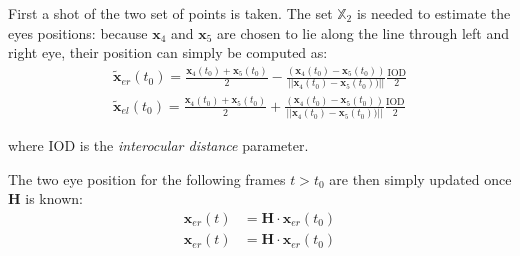 \documentclass[acmtocl,acmnow]{acmtrans2m}
\begin{document}
First a shot of the two set of points is taken. The set $\mathbb{X}_2$ is needed
to estimate the eyes positions: because $\mathbf{x}_4$ and $\mathbf{x}_5$ are
chosen to lie
along the line through left and right eye, their position can simply be computed
as:
\begin{eqnarray*}
\tilde{\mathbf{x}}_{er}(t_0) =  \frac{\mathbf{x}_4(t_0) + \mathbf{x}_5(t_0)}{2}
-  \frac{ (\mathbf{x}_4(t_0) - \mathbf{x}_5(t_0)) }{||\mathbf{x}_4(t_0) -
\mathbf{x}_5(t_0))||}\frac{\textrm{IOD}}{2} \\
\tilde{\mathbf{x}}_{el}(t_0) =  \frac{\mathbf{x}_4(t_0) + \mathbf{x}_5(t_0)}{2}
+  \frac{ (\mathbf{x}_4(t_0) - \mathbf{x}_5(t_0)) }{||\mathbf{x}_4(t_0) -
\mathbf{x}_5(t_0))||}\frac{\textrm{IOD}}{2}
\end{eqnarray*}

where $\textrm{IOD}$ is the \emph{interocular distance} parameter.

The two eye position for the following frames $t>t_0$ are then simply updated
once $\mathbf{H}$ is known:
\begin{eqnarray*}
	\mathbf{x}_{er}(t) &= \mathbf{H} \cdot \mathbf{x}_{er}(t_0) \\
	\mathbf{x}_{er}(t) &= \mathbf{H} \cdot \mathbf{x}_{er}(t_0) 
\end{eqnarray*}
\end{document}

